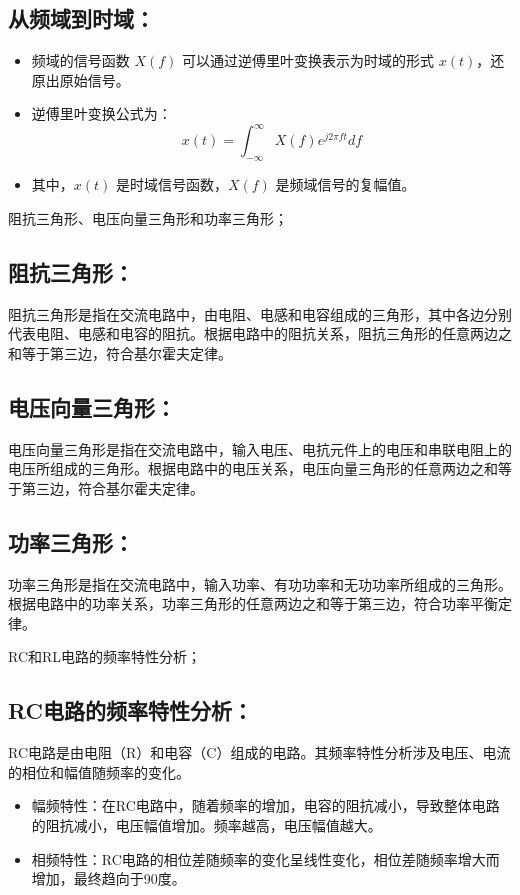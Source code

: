 \documentclass[dvipsnames, svgnames,a4paper,11pt]{article}
\begin{document}
\subsection*{从频域到时域：}
\begin{itemize}
  \item 频域的信号函数 $X(f)$ 可以通过逆傅里叶变换表示为时域的形式 $x(t)$，还原出原始信号。
  \item 逆傅里叶变换公式为：
    \[
    x(t) = \int_{-\infty}^{\infty} X(f)e^{j2\pi ft} df
    \]
  \item 其中，$x(t)$ 是时域信号函数，$X(f)$ 是频域信号的复幅值。
\end{itemize}
	
	\begin{question}
		阻抗三角形、电压向量三角形和功率三角形；
	\end{question}
	\subsection*{阻抗三角形：}
	阻抗三角形是指在交流电路中，由电阻、电感和电容组成的三角形，其中各边分别代表电阻、电感和电容的阻抗。根据电路中的阻抗关系，阻抗三角形的任意两边之和等于第三边，符合基尔霍夫定律。
	
	\subsection*{电压向量三角形：}
	电压向量三角形是指在交流电路中，输入电压、电抗元件上的电压和串联电阻上的电压所组成的三角形。根据电路中的电压关系，电压向量三角形的任意两边之和等于第三边，符合基尔霍夫定律。
	
	\subsection*{功率三角形：}
	功率三角形是指在交流电路中，输入功率、有功功率和无功功率所组成的三角形。根据电路中的功率关系，功率三角形的任意两边之和等于第三边，符合功率平衡定律。
	


	\begin{question}
		RC和RL电路的频率特性分析；
	\end{question}
	\subsection*{RC电路的频率特性分析：}
RC电路是由电阻（R）和电容（C）组成的电路。其频率特性分析涉及电压、电流的相位和幅值随频率的变化。
\begin{itemize}
  \item 幅频特性：在RC电路中，随着频率的增加，电容的阻抗减小，导致整体电路的阻抗减小，电压幅值增加。频率越高，电压幅值越大。
  \item 相频特性：RC电路的相位差随频率的变化呈线性变化，相位差随频率增大而增加，最终趋向于90度。
\end{itemize}
\end{document}
